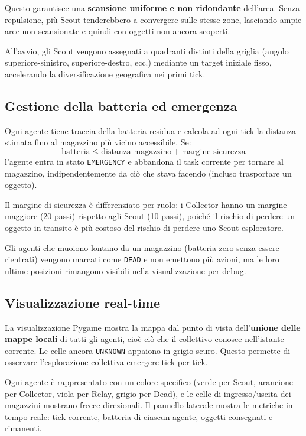 Questo garantisce una \textbf{scansione uniforme e non ridondante} dell'area. Senza repulsione, più Scout tenderebbero a convergere sulle stesse zone, lasciando ampie aree non scansionate e quindi con oggetti non ancora scoperti.

All'avvio, gli Scout vengono assegnati a quadranti distinti della griglia (angolo superiore-sinistro, superiore-destro, ecc.) mediante un target iniziale fisso, accelerando la diversificazione geografica nei primi tick.

\subsection{Gestione della batteria ed emergenza}

Ogni agente tiene traccia della batteria residua e calcola ad ogni tick la distanza stimata fino al magazzino più vicino accessibile. Se:
\[
\text{batteria} \leq \text{distanza\_magazzino} + \text{margine\_sicurezza}
\]
l'agente entra in stato \texttt{EMERGENCY} e abbandona il task corrente per tornare al magazzino, indipendentemente da ciò che stava facendo (incluso trasportare un oggetto).

Il margine di sicurezza è differenziato per ruolo: i Collector hanno un margine maggiore (20 passi) rispetto agli Scout (10 passi), poiché il rischio di perdere un oggetto in transito è più costoso del rischio di perdere uno Scout esploratore.

Gli agenti che muoiono lontano da un magazzino (batteria zero senza essere rientrati) vengono marcati come \texttt{DEAD} e non emettono più azioni, ma le loro ultime posizioni rimangono visibili nella visualizzazione per debug.

\subsection{Visualizzazione real-time}

La visualizzazione Pygame mostra la mappa dal punto di vista dell'\textbf{unione delle mappe locali} di tutti gli agenti, cioè ciò che il collettivo conosce nell'istante corrente. Le celle ancora \texttt{UNKNOWN} appaiono in grigio scuro. Questo permette di osservare l'esplorazione collettiva emergere tick per tick.

Ogni agente è rappresentato con un colore specifico (verde per Scout, arancione per Collector, viola per Relay, grigio per Dead), e le celle di ingresso/uscita dei magazzini mostrano frecce direzionali. Il pannello laterale mostra le metriche in tempo reale: tick corrente, batteria di ciascun agente, oggetti consegnati e rimanenti.

